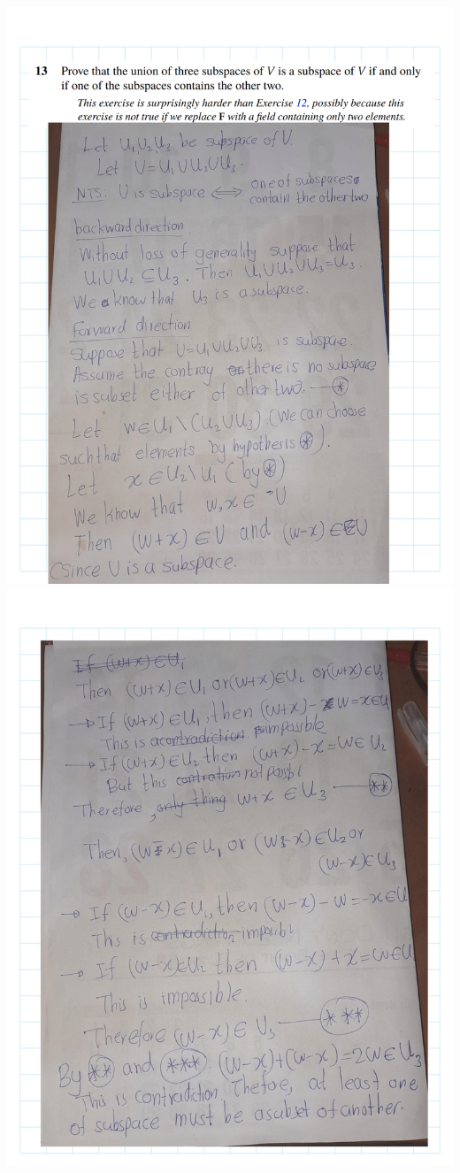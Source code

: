 \documentclass[
]{book}
\theoremstyle{definition}
\theoremstyle{definition}
\theoremstyle{definition}
\theoremstyle{definition}
\theoremstyle{remark}
\begin{document}
\begin{enumerate}
  \includegraphics{fig/Ex1C/Ex/Ex-14.png} \includegraphics{fig/Ex1C/Ex/Ex-15.png}

\end{enumerate}
\end{document}
